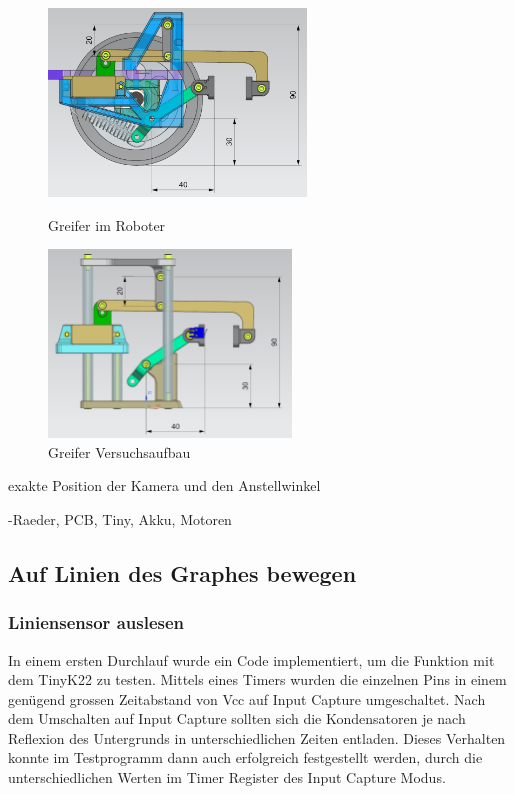 \begin{figure}[H]
  \centering
  \begin{minipage}[b]{0.45\textwidth}
    \centering
    \includegraphics[height=5cm]{assets/MT/Greifer Montiert.png}
    \caption{Greifer im Roboter}
    \label{fig:Greifer im Roboter}
  \end{minipage}
  \hfill
  \begin{minipage}[b]{0.45\textwidth}
    \centering
    \includegraphics[height=5cm]{assets/MT/Greifer Prototyp.png}
    \caption{Greifer Versuchsaufbau}
    \label{fig:Greifer Versuchsaufbau}
  \end{minipage}
\end{figure}

exakte Position der Kamera und den Anstellwinkel 

-Raeder, PCB, Tiny, Akku, Motoren


\newpage

\subsection{Auf Linien des Graphes bewegen}

\subsubsection{Liniensensor auslesen}

In einem ersten Durchlauf wurde ein Code implementiert, um die Funktion mit dem TinyK22 zu testen. Mittels eines Timers wurden die einzelnen Pins in einem genügend grossen Zeitabstand von Vcc auf Input Capture umgeschaltet. Nach dem Umschalten auf Input Capture sollten sich die Kondensatoren je nach Reflexion des Untergrunds in unterschiedlichen Zeiten entladen. Dieses Verhalten konnte im Testprogramm dann auch erfolgreich festgestellt werden, durch die unterschiedlichen Werten im Timer Register des Input Capture Modus.


